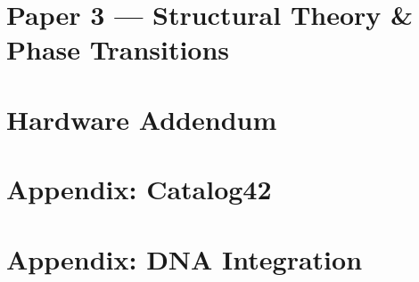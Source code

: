 \documentclass[11pt,a4paper]{book}
\begin{document}
\part{Paper 3 --- Structural Theory \& Phase Transitions}



















\part*{Hardware Addendum}









\part*{Appendix: Catalog42}





\part*{Appendix: DNA Integration}








\end{document}
